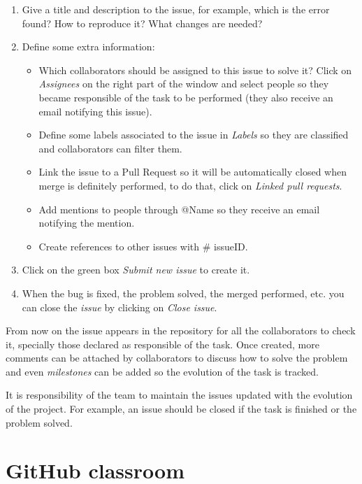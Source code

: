 \begin{enumerate}
\setlength\itemsep{0.0cm}
\item Give a title and description to the issue, for example, which is the error found? How to reproduce it? What changes are needed?
\item Define some extra information:
    \begin{itemize}
        \item Which collaborators should be assigned to this issue to solve it? Click on \textit{Assignees} on the right part of the window and select people so they became responsible of the task to be performed (they also receive an email notifying this issue).
        \item Define some labels associated to the issue in \textit{Labels} so they are classified and collaborators can filter them. 
        \item Link the issue to a Pull Request so it will be automatically closed when merge is definitely performed, to do that, click on \textit{Linked pull requests}.  
        \item Add mentions to people through @Name so they receive an email notifying the mention. 
        \item Create references to other issues with \# issueID.
    \end{itemize}    
\item Click on the green box \textit{Submit new issue} to create it.

\item When the bug is fixed, the problem solved, the merged performed, etc. you can close the \textit{issue} by clicking on \textit{Close issue}. 
\end{enumerate}

From now on the issue appears in the repository for all the collaborators to check it, 
specially those declared as responsible of the task. 
Once created, more comments can be attached by collaborators to discuss how to solve 
the problem and even \textit{milestones} can be added so the evolution of the task is tracked. 

It is responsibility of the team to maintain the issues updated with the evolution of the project. 
For example, an issue should be closed if the task is finished or the problem solved. 




\section{GitHub classroom}


















